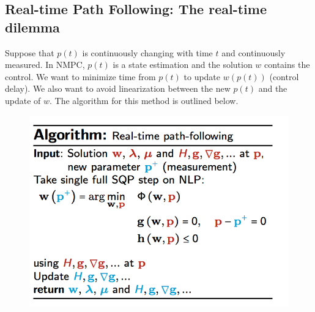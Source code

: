 \documentclass{article}
\theoremstyle{example}
\theoremstyle{definition}
\theoremstyle{assumption}
\theoremstyle{lemma}
\begin{document}
	\subsection{Real-time Path Following: The real-time dilemma}
	Suppose that $p(t)$ is continuously changing with time $t$ and continuously measured. 
	In NMPC, $p(t)$ is a state estimation and the solution $w$ contains the control. We want to minimize time from $p(t)$ to update $w(p(t))$ (control delay).
	We also want to avoid linearization between the new $p(t)$ and the update of $w$.
	The algorithm for this method is outlined below.
	\begin{figure}[H]
		\centering
		\includegraphics{real_time}
	\end{figure}
\end{document}
